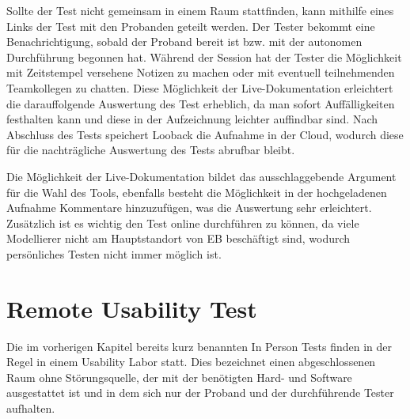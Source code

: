 Sollte der Test nicht gemeinsam in einem Raum stattfinden, kann mithilfe eines Links der Test mit den Probanden geteilt werden.
Der Tester bekommt eine Benachrichtigung, sobald der Proband bereit ist bzw. mit der autonomen Durchführung begonnen hat.
Während der Session hat der Tester die Möglichkeit mit Zeitstempel versehene Notizen zu machen oder mit eventuell teilnehmenden Teamkollegen zu chatten.
Diese Möglichkeit der Live-Dokumentation erleichtert die darauffolgende Auswertung des Test erheblich, da man sofort Auffälligkeiten festhalten kann und diese in der Aufzeichnung leichter auffindbar sind.
Nach Abschluss des Tests speichert Looback die Aufnahme in der Cloud, wodurch diese für die nachträgliche Auswertung des Tests abrufbar bleibt. \cite{.10.01.2020}

Die Möglichkeit der Live-Dokumentation bildet das ausschlaggebende Argument für die Wahl des Tools, ebenfalls besteht die Möglichkeit in der hochgeladenen Aufnahme Kommentare hinzuzufügen, was die Auswertung sehr erleichtert.
Zusätzlich ist es wichtig den Test online durchführen zu können, da viele Modellierer nicht am Hauptstandort von EB beschäftigt sind, wodurch persönliches Testen nicht immer möglich ist.

\section{Remote Usability Test}
Die im vorherigen Kapitel bereits kurz benannten \glqq In Person\grqq{} Tests finden in der Regel in einem Usability Labor statt.
Dies bezeichnet einen abgeschlossenen Raum ohne Störungsquelle, der mit der benötigten Hard- und Software ausgestattet ist und in dem sich nur der Proband und der durchführende Tester aufhalten.

